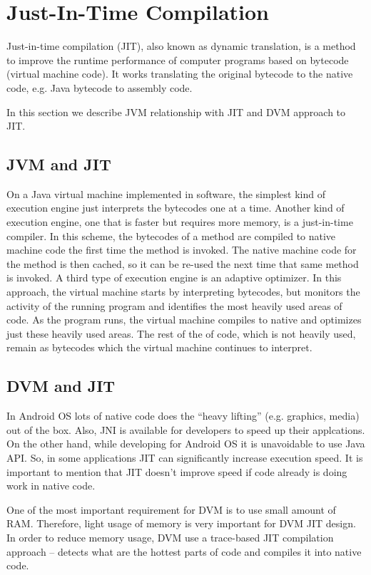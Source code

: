 \documentclass[11pt, oneside]{article}   	%
\begin{document}
\section{Just-In-Time Compilation}

Just-in-time compilation (JIT), also known as dynamic translation, is a method to improve the runtime performance of computer programs based on bytecode (virtual machine code). It works translating the original bytecode to the native code, e.g. Java bytecode to assembly code. 

In this section we describe JVM relationship with JIT and DVM approach to JIT.

\subsection{JVM and JIT}

On a Java virtual machine implemented in software, the simplest kind of execution engine just interprets the bytecodes one at a time. Another kind of execution engine, one that is faster but requires more memory, is a just-in-time compiler. In this scheme, the bytecodes of a method are compiled to native machine code the first time the method is invoked. The native machine code for the method is then cached, so it can be re-used the next time that same method is invoked. A third type of execution engine is an adaptive optimizer. In this approach, the virtual machine starts by interpreting bytecodes, but monitors the activity of the running program and identifies the most heavily used areas of code. As the program runs, the virtual machine compiles to native and optimizes just these heavily used areas. The rest of the of code, which is not heavily used, remain as bytecodes which the virtual machine continues to interpret. 

\subsection{DVM and JIT}

In Android OS lots of native code does the ``heavy lifting'' (e.g. graphics, media) out of the box. Also, JNI is available for developers to speed up their applcations. On the other hand, while developing for Android OS it is unavoidable to use Java API. So, in some applications JIT can significantly increase execution speed. It is important to mention that JIT doesn't improve speed if code already is doing work in native code.

One of the most important requirement for DVM is to use small amount of RAM. Therefore, light usage of memory is very important for DVM JIT design. In order to reduce memory usage, DVM use a trace-based JIT compilation approach -- detects what are the hottest parts of code and compiles it into native code. 
\end{document}
